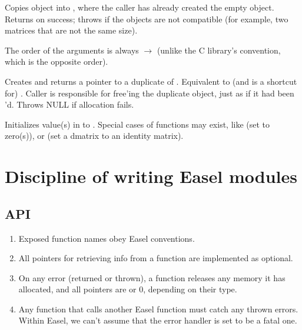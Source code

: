 \begin{sreitems}{}

\item[\ccode{\_Copy(src, dest)}]
Copies  object into , where the caller has
already created the empty  object. Returns 
on success; throws  if the objects are not
compatible (for example, two matrices that are not the same size).

The order of the arguments is always  $\rightarrow$
 (unlike the C library's  convention, which
is the opposite order).

\item[\ccode{\_Duplicate(obj)}] 

Creates and returns a pointer to a duplicate of .
Equivalent to (and is a shortcut for) . Caller is responsible for free'ing the duplicate
object, just as if it had been 'd. Throws NULL if
allocation fails.

\item[\ccode{\_Set*(obj, value...)}]

Initializes value(s) in  to . Special cases of
 functions may exist, like  (set to
zero(s)), or  (set a dmatrix to an
identity matrix).

\end{sreitems}




\section{Discipline of writing Easel modules}


\subsection{API}

\begin{enumerate}
\item Exposed function names obey Easel conventions.

\item All  pointers for retrieving info from 
      a function are implemented as optional.

\item On any error (returned or thrown), a function releases any
      memory it has allocated, and all  pointers are
       or 0, depending on their type.

\item Any function that calls another Easel function must 
      catch any thrown errors. Within Easel, we
      can't assume that the error handler is set to be a fatal
      one.
\end{enumerate}


